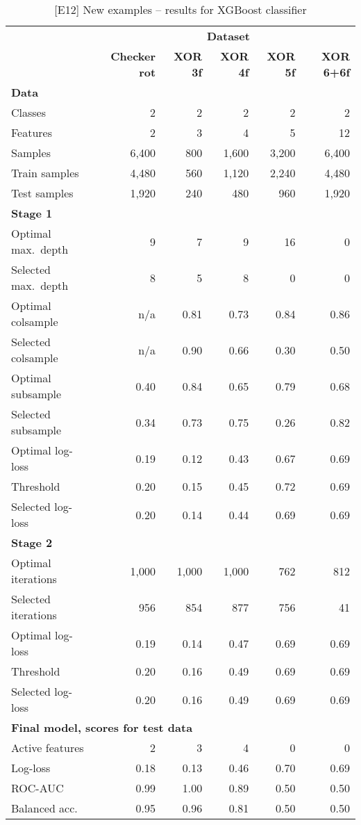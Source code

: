 \begin{table}
\caption{[E12]  New examples -- results for XGBoost classifier}
\label{tab_e12}
%
\begin{center}
\small
\begin{tabular}{|lrrrrr|}
\hline
&\multicolumn{5}{c|}{\textbf{\hrulefill\ Dataset \hrulefill}}\\
&\textbf{Checker rot}&\textbf{XOR 3f}&\textbf{XOR 4f}&\textbf{XOR 5f}&\textbf{XOR 6+6f}\\
\multicolumn{6}{|l|}{\textbf{Data}}\\
Classes&2&2&2&2&2\\
Features&2&3&4&5&12\\
Samples&6,400&800&1,600&3,200&6,400\\
Train samples&4,480&560&1,120&2,240&4,480\\
Test samples&1,920&240&480&960&1,920\\
\multicolumn{6}{|l|}{\textbf{Stage 1}}\\
Optimal max.\ depth&9&7&9&16&0\\
Selected max.\ depth&8&5&8&0&0\\
Optimal colsample&n/a&0.81&0.73&0.84&0.86\\
Selected colsample&n/a&0.90&0.66&0.30&0.50\\
Optimal subsample&0.40&0.84&0.65&0.79&0.68\\
Selected subsample&0.34&0.73&0.75&0.26&0.82\\
Optimal log-loss&0.19&0.12&0.43&0.67&0.69\\
Threshold&0.20&0.15&0.45&0.72&0.69\\
Selected log-loss&0.20&0.14&0.44&0.69&0.69\\
\multicolumn{6}{|l|}{\textbf{Stage 2}}\\
Optimal iterations&1,000&1,000&1,000&762&812\\
Selected iterations&956&854&877&756&41\\
Optimal log-loss&0.19&0.14&0.47&0.69&0.69\\
Threshold&0.20&0.16&0.49&0.69&0.69\\
Selected log-loss&0.20&0.16&0.49&0.69&0.69\\
\multicolumn{6}{|l|}{\textbf{Final model, scores for test data}}\\
Active features&2&3&4&0&0\\
Log-loss&0.18&0.13&0.46&0.70&0.69\\
ROC-AUC&0.99&1.00&0.89&0.50&0.50\\
Balanced acc.&0.95&0.96&0.81&0.50&0.50\\
\hline
\end{tabular}
\end{center}
\end{table}
